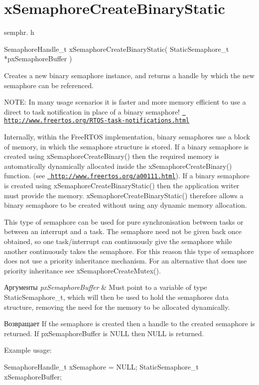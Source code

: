 \hypertarget{group__x_semaphore_create_binary_static}{}\section{x\+Semaphore\+Create\+Binary\+Static}
\label{group__x_semaphore_create_binary_static}
semphr. h 
\begin{DoxyPre}SemaphoreHandle\_t xSemaphoreCreateBinaryStatic( StaticSemaphore\_t *pxSemaphoreBuffer )\end{DoxyPre}


Creates a new binary semaphore instance, and returns a handle by which the new semaphore can be referenced.

N\+O\+TE\+: In many usage scenarios it is faster and more memory efficient to use a direct to task notification in place of a binary semaphore! \href{http://www.freertos.org/RTOS-task-notifications.html}{\texttt{ http\+://www.\+freertos.\+org/\+R\+T\+O\+S-\/task-\/notifications.\+html}}

Internally, within the Free\+R\+T\+OS implementation, binary semaphores use a block of memory, in which the semaphore structure is stored. If a binary semaphore is created using x\+Semaphore\+Create\+Binary() then the required memory is automatically dynamically allocated inside the x\+Semaphore\+Create\+Binary() function. (see \href{http://www.freertos.org/a00111.html}{\texttt{ http\+://www.\+freertos.\+org/a00111.\+html}}). If a binary semaphore is created using x\+Semaphore\+Create\+Binary\+Static() then the application writer must provide the memory. x\+Semaphore\+Create\+Binary\+Static() therefore allows a binary semaphore to be created without using any dynamic memory allocation.

This type of semaphore can be used for pure synchronisation between tasks or between an interrupt and a task. The semaphore need not be given back once obtained, so one task/interrupt can continuously \textquotesingle{}give\textquotesingle{} the semaphore while another continuously \textquotesingle{}takes\textquotesingle{} the semaphore. For this reason this type of semaphore does not use a priority inheritance mechanism. For an alternative that does use priority inheritance see x\+Semaphore\+Create\+Mutex().


\begin{DoxyParams}{Аргументы}
{\em px\+Semaphore\+Buffer} & Must point to a variable of type Static\+Semaphore\+\_\+t, which will then be used to hold the semaphore\textquotesingle{}s data structure, removing the need for the memory to be allocated dynamically.\\
\hline
\end{DoxyParams}
\begin{DoxyReturn}{Возвращает}
If the semaphore is created then a handle to the created semaphore is returned. If px\+Semaphore\+Buffer is N\+U\+LL then N\+U\+LL is returned.
\end{DoxyReturn}
Example usage\+: 
\begin{DoxyPre}
SemaphoreHandle\_t xSemaphore = NULL;
StaticSemaphore\_t xSemaphoreBuffer;\end{DoxyPre}



